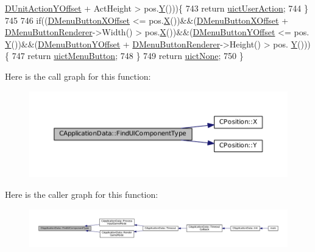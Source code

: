 \begin{DoxyCode}
      \hyperlink{classCApplicationData_a8ccfb55bd25cba0e6eb66573ba9c8b3c}{DUnitActionYOffset} + ActHeight > pos.\hyperlink{classCPosition_a1aa8a30e2f08dda1f797736ba8c13a87}{Y}()))\{
743         \textcolor{keywordflow}{return} \hyperlink{classCApplicationData_ad49585591fc53bff1c89bc512170280da9b2752db122b319f942c3b69c2accfab}{uictUserAction};
744     \}
745     
746     \textcolor{keywordflow}{if}((\hyperlink{classCApplicationData_a04283b17a8c04af8325de4304a848095}{DMenuButtonXOffset} <= pos.\hyperlink{classCPosition_a9a6b94d3b91df1492d166d9964c865fc}{X}())&&(\hyperlink{classCApplicationData_a04283b17a8c04af8325de4304a848095}{DMenuButtonXOffset} + 
      \hyperlink{classCApplicationData_a2c9f10aa452454a016e0164f6ce777a6}{DMenuButtonRenderer}->Width() > pos.\hyperlink{classCPosition_a9a6b94d3b91df1492d166d9964c865fc}{X}())&&(\hyperlink{classCApplicationData_a63012360d0a98eef89707a503f4379a8}{DMenuButtonYOffset} <= pos.
      \hyperlink{classCPosition_a1aa8a30e2f08dda1f797736ba8c13a87}{Y}())&&(\hyperlink{classCApplicationData_a63012360d0a98eef89707a503f4379a8}{DMenuButtonYOffset} + \hyperlink{classCApplicationData_a2c9f10aa452454a016e0164f6ce777a6}{DMenuButtonRenderer}->Height() > pos.
      \hyperlink{classCPosition_a1aa8a30e2f08dda1f797736ba8c13a87}{Y}()))\{
747         \textcolor{keywordflow}{return} \hyperlink{classCApplicationData_ad49585591fc53bff1c89bc512170280da8323c73a1745d4b4e6e469088041f264}{uictMenuButton};
748     \}
749     \textcolor{keywordflow}{return} \hyperlink{classCApplicationData_ad49585591fc53bff1c89bc512170280da21bc83c610f1f8b1d686aed22d343f93}{uictNone};
750 \}
\end{DoxyCode}
Here is the call graph for this function\+:
\nopagebreak
\begin{figure}[H]
\begin{center}
\leavevmode
\includegraphics[width=350pt]{classCApplicationData_a1fb2747750babd9b82f51ce206ee6755_cgraph}
\end{center}
\end{figure}
Here is the caller graph for this function\+:
\nopagebreak
\begin{figure}[H]
\begin{center}
\leavevmode
\includegraphics[width=350pt]{classCApplicationData_a1fb2747750babd9b82f51ce206ee6755_icgraph}
\end{center}
\end{figure}
